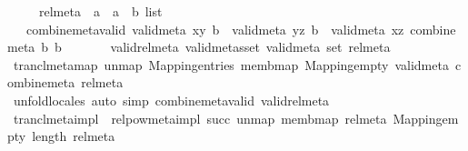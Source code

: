 \begin{isabellebody}
\ \ \ \ \ rel{\isacharunderscore}{\kern0pt}meta\ {\isacharcolon}{\kern0pt}{\isacharcolon}{\kern0pt}\ {\isachardoublequoteopen}{\isacharparenleft}{\kern0pt}{\isacharparenleft}{\kern0pt}{\isacharprime}{\kern0pt}a\ {\isasymtimes}\ {\isacharprime}{\kern0pt}a{\isacharparenright}{\kern0pt}\ {\isasymtimes}\ {\isacharprime}{\kern0pt}b{\isacharparenright}{\kern0pt}\ list{\isachardoublequoteclose}\isanewline
\ \ \ combine{\isacharunderscore}{\kern0pt}meta{\isacharunderscore}{\kern0pt}valid{\isacharcolon}{\kern0pt}\ {\isachardoublequoteopen}valid{\isacharunderscore}{\kern0pt}meta\ {\isacharparenleft}{\kern0pt}x{\isacharcomma}{\kern0pt}y{\isacharparenright}{\kern0pt}\ b{}\ {\isasymLongrightarrow}\ valid{\isacharunderscore}{\kern0pt}meta\ {\isacharparenleft}{\kern0pt}y{\isacharcomma}{\kern0pt}z{\isacharparenright}{\kern0pt}\ b{}\ {\isasymLongrightarrow}\ valid{\isacharunderscore}{\kern0pt}meta\ {\isacharparenleft}{\kern0pt}x{\isacharcomma}{\kern0pt}z{\isacharparenright}{\kern0pt}\ {\isacharparenleft}{\kern0pt}combine{\isacharunderscore}{\kern0pt}meta\ b{}\ b{}{\isacharparenright}{\kern0pt}{\isachardoublequoteclose}\isanewline
\ \ \ \ \ \ \ valid{\isacharunderscore}{\kern0pt}rel{\isacharunderscore}{\kern0pt}meta{\isacharcolon}{\kern0pt}\ {\isachardoublequoteopen}valid{\isacharunderscore}{\kern0pt}metas{\isacharunderscore}{\kern0pt}set\ valid{\isacharunderscore}{\kern0pt}meta\ {\isacharparenleft}{\kern0pt}set\ rel{\isacharunderscore}{\kern0pt}meta{\isacharparenright}{\kern0pt}{\isachardoublequoteclose}\isanewline
{}\isanewline
\isanewline
{}\isamarkupfalse%
\ trancl{\isacharunderscore}{\kern0pt}meta{\isacharunderscore}{\kern0pt}map\ un{\isacharunderscore}{\kern0pt}map\ Mapping{\isachardot}{\kern0pt}entries\ memb{\isacharunderscore}{\kern0pt}map\ Mapping{\isachardot}{\kern0pt}empty\ valid{\isacharunderscore}{\kern0pt}meta\ combine{\isacharunderscore}{\kern0pt}meta\ rel{\isacharunderscore}{\kern0pt}meta\isanewline
%
\isadelimproof
\ \ %
\endisadelimproof
%
\isatagproof
{}\isamarkupfalse%
\ unfold{\isacharunderscore}{\kern0pt}locales\ {\isacharparenleft}{\kern0pt}auto\ simp{\isacharcolon}{\kern0pt}\ combine{\isacharunderscore}{\kern0pt}meta{\isacharunderscore}{\kern0pt}valid\ valid{\isacharunderscore}{\kern0pt}rel{\isacharunderscore}{\kern0pt}meta{\isacharparenright}{\kern0pt}%
\endisatagproof
{\isafoldproof}%
%
\isadelimproof
\isanewline
%
\endisadelimproof
\isanewline
{}\isamarkupfalse%
\ {\isachardoublequoteopen}trancl{\isacharunderscore}{\kern0pt}meta{\isacharunderscore}{\kern0pt}impl\ {\isasymequiv}\ {\isacharparenleft}{\kern0pt}relpow{\isacharunderscore}{\kern0pt}meta{\isacharunderscore}{\kern0pt}impl\ succ\ un{\isacharunderscore}{\kern0pt}map\ memb{\isacharunderscore}{\kern0pt}map\ rel{\isacharunderscore}{\kern0pt}meta\ Mapping{\isachardot}{\kern0pt}empty\ {\isacharparenleft}{\kern0pt}length\ rel{\isacharunderscore}{\kern0pt}meta{\isacharparenright}{\kern0pt}{\isacharparenright}{\kern0pt}{\isachardoublequoteclose}\isanewline

\end{isabellebody}
